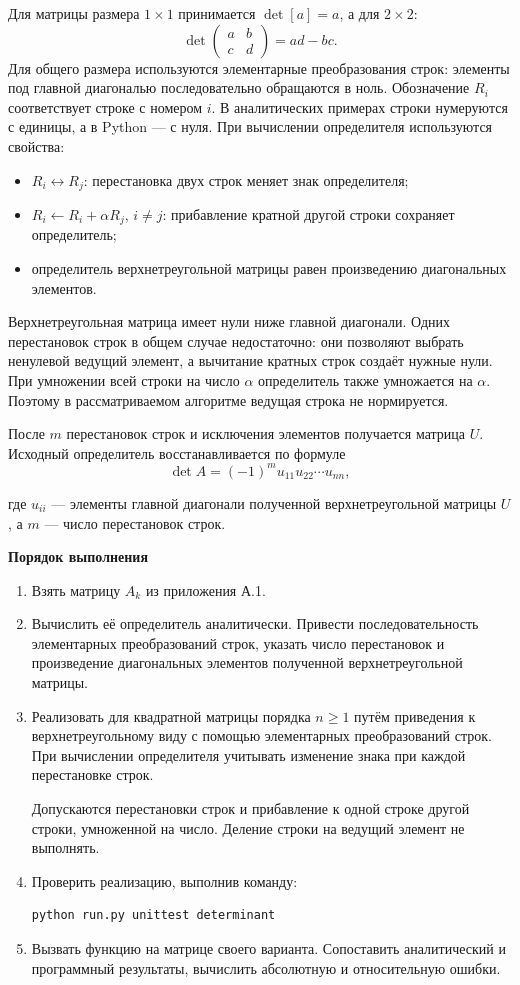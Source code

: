 \documentclass[12pt,a4paper]{article}
\newcommand{\taskhead}[1]{\par\textbf{#1}\par}
\begin{document}
Для матрицы размера $1\times1$ принимается $\det[a]=a$, а для $2\times2$:
\[
\det\begin{pmatrix}a&b\\c&d\end{pmatrix}=ad-bc.
\]
Для общего размера используются элементарные преобразования строк: элементы под главной
диагональю последовательно обращаются в ноль. Обозначение $R_i$ соответствует
строке с номером $i$. В аналитических примерах строки нумеруются с единицы,
а в Python --- с нуля. При вычислении определителя используются свойства:
\begin{itemize}
\item $R_i\leftrightarrow R_j$: перестановка двух строк меняет знак определителя;
\item $R_i\gets R_i+\alpha R_j$, $i\ne j$: прибавление кратной другой строки
сохраняет определитель;
\item определитель верхнетреугольной матрицы равен произведению диагональных элементов.
\end{itemize}
Верхнетреугольная матрица имеет нули ниже главной диагонали. Одних
перестановок строк в общем случае недостаточно: они позволяют выбрать
ненулевой ведущий элемент, а вычитание кратных строк создаёт нужные нули.
При умножении всей строки на число $\alpha$ определитель также умножается
на $\alpha$. Поэтому в рассматриваемом алгоритме ведущая строка не нормируется.

После $m$ перестановок строк и исключения элементов получается матрица $U$.
Исходный определитель восстанавливается по формуле
\[
\det A=(-1)^m u_{11}u_{22}\cdots u_{nn},
\]

где $u_{ii}$ --- элементы главной диагонали полученной
верхнетреугольной матрицы $U$, а $m$ --- число перестановок строк.

\taskhead{Порядок выполнения}
\begin{enumerate}
  \item Взять матрицу $A_k$ из приложения А.1.
  \item Вычислить её определитель аналитически.
  Привести последовательность элементарных преобразований
  строк, указать число перестановок и произведение
  диагональных элементов полученной верхнетреугольной матрицы.
  \item Реализовать  для квадратной матрицы
  порядка $n \geq 1$ путём приведения к верхнетреугольному виду
  с помощью элементарных преобразований строк.
  При вычислении определителя учитывать изменение знака
  при каждой перестановке строк.
  
  Допускаются перестановки строк и прибавление к одной строке
  другой строки, умноженной на число. Деление строки
  на ведущий элемент не выполнять.\\
  \item Проверить реализацию, выполнив команду:
  \begin{lstlisting}[style=commands]
python run.py unittest determinant\end{lstlisting}
  \item Вызвать функцию на матрице своего варианта.
  Сопоставить аналитический и программный результаты,
  вычислить абсолютную и относительную ошибки.
\end{enumerate}
\end{document}
